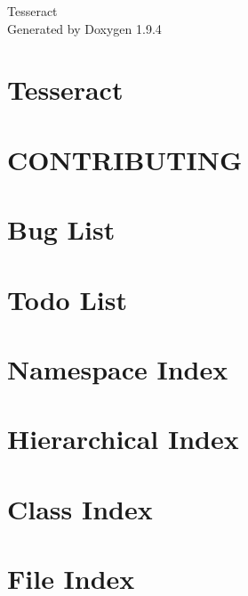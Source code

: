 \documentclass[twoside]{book}
\newcommand{\+}{\discretionary{\mbox{\scriptsize$\hookleftarrow$}}{}{}}
\newcommand{\clearemptydoublepage}{%
    \newpage{\pagestyle{empty}\cleardoublepage}%
  }
\begin{document}
  \raggedbottom
    \hypersetup{pageanchor=false,
                bookmarksnumbered=true,
                pdfencoding=unicode
               }
  \begin{titlepage}
  \vspace*{7cm}
  \begin{center}%
  {\Large Tesseract}\\
  \vspace*{1cm}
  {\large Generated by Doxygen 1.9.4}\\
  \end{center}
  \end{titlepage}
  \clearemptydoublepage
  \tableofcontents
  \clearemptydoublepage
  \hypersetup{pageanchor=true}
\chapter{Tesseract}
\label{index}\hypertarget{index}{}
\chapter{CONTRIBUTING}
\label{md_CONTRIBUTING}

\chapter{Bug List}
\label{bug}

\chapter{Todo List}
\label{todo}

\chapter{Namespace Index}

\chapter{Hierarchical Index}

\chapter{Class Index}

\chapter{File Index}

\end{document}
